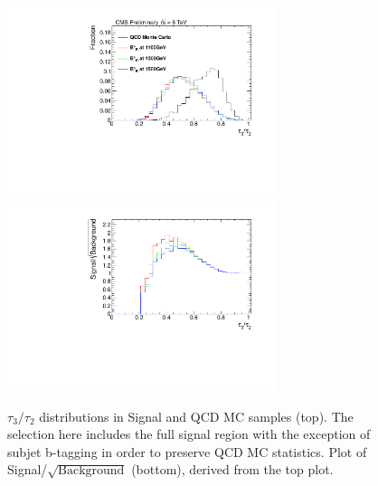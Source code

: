 \begin{figure}[htcb]
\begin{center}
\includegraphics[width=0.7\textwidth]{AN-14-049/figs/tau32rightCompqcdandsignal.pdf}\\
\includegraphics[width=0.7\textwidth]{AN-14-049/figs/tau32rightSNRqcdandsignal.pdf}
\caption{
$\tau_3/\tau_2$ distributions in Signal and QCD MC samples (top).  The selection here includes the full signal region with the exception of subjet b-tagging in order to preserve QCD MC statistics.  Plot of Signal/$\sqrt{\text{Background}}$ (bottom), derived from the top plot.
}
\label{figs:bsNsubCOMP}
\end{center}
\end{figure}





